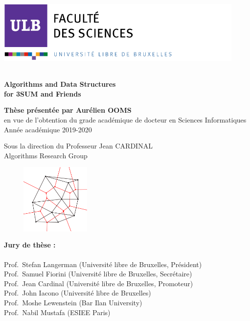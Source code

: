 \documentclass[b5paper,12pt]{article}
\newcommand\blankpage{%
    \null
    \thispagestyle{empty}%
    \addtocounter{page}{-1}%
    \newpage}
\begin{document}
\includegraphics[width=12.3cm, height=3.07cm]{sciences.png} \\ \\

\begin{tcolorbox}
\color[rgb]{1,1,1}

\Large{\textbf{Algorithms and Data Structures\\ for 3SUM and Friends}}
\end{tcolorbox}

\begin{tcolorbox}[colback=white, halign=left]
\color{darkblue}
\large{\textbf{Thèse présentée par Aurélien OOMS}} \\
\color{black}
\small{en vue de l'obtention du grade académique de docteur en Sciences Informatiques \\
Année académique 2019-2020}

\vspace{2cm}

\begin{flushright}
\color{darkblue}
Sous la direction du Professeur Jean CARDINAL \\
\color{black}
Algorithms Research Group
\end{flushright}
\end{tcolorbox}
\vspace{3cm}


\begin{figure}
\includegraphics[width=3.45cm]{algorithms.png}
\end{figure}
\noindent
\textbf{Jury de thèse : } \\  \\
Prof.~Stefan Langerman (Université libre de Bruxelles, Président) \\
Prof.~Samuel Fiorini (Université libre de Bruxelles, Secrétaire) \\
Prof.~Jean Cardinal (Université libre de Bruxelles, Promoteur) \\
Prof.~John Iacono (Université libre de Bruxelles) \\
Prof.~Moshe Lewenstein (Bar Ilan University) \\
Prof.~Nabil Mustafa (ESIEE Paris) \\

\afterpage{\blankpage}
\end{document}
